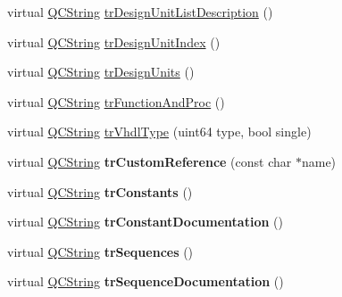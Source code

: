 \begin{DoxyCompactItemize}
\item 
virtual \mbox{\hyperlink{class_q_c_string}{Q\+C\+String}} \mbox{\hyperlink{class_translator_brazilian_aa790d2672648700af93604e5b8d4779d}{tr\+Design\+Unit\+List\+Description}} ()
\item 
virtual \mbox{\hyperlink{class_q_c_string}{Q\+C\+String}} \mbox{\hyperlink{class_translator_brazilian_ac42aa7b09227dfed71f923c7f3adffc8}{tr\+Design\+Unit\+Index}} ()
\item 
virtual \mbox{\hyperlink{class_q_c_string}{Q\+C\+String}} \mbox{\hyperlink{class_translator_brazilian_a39cab5e13d360ff7bf232c10189975c2}{tr\+Design\+Units}} ()
\item 
virtual \mbox{\hyperlink{class_q_c_string}{Q\+C\+String}} \mbox{\hyperlink{class_translator_brazilian_a035d996869c5c8e3f2fe15c9fd28238b}{tr\+Function\+And\+Proc}} ()
\item 
virtual \mbox{\hyperlink{class_q_c_string}{Q\+C\+String}} \mbox{\hyperlink{class_translator_brazilian_a8cfd7c0ac4952835ab2ca311aa32f74e}{tr\+Vhdl\+Type}} (uint64 type, bool single)
\item 
\mbox{\label{class_translator_brazilian_a1452cfd246d529e979d29ba217476521}} 
virtual \mbox{\hyperlink{class_q_c_string}{Q\+C\+String}} {\bfseries tr\+Custom\+Reference} (const char $\ast$name)
\item 
\mbox{\label{class_translator_brazilian_adabcc54dc066018a18de3dcae28d25f5}} 
virtual \mbox{\hyperlink{class_q_c_string}{Q\+C\+String}} {\bfseries tr\+Constants} ()
\item 
\mbox{\label{class_translator_brazilian_ac54b940d953e3db9c2403484af866baa}} 
virtual \mbox{\hyperlink{class_q_c_string}{Q\+C\+String}} {\bfseries tr\+Constant\+Documentation} ()
\item 
\mbox{\label{class_translator_brazilian_ad9dc57350c6eb1ca0ee3143e96ea24d6}} 
virtual \mbox{\hyperlink{class_q_c_string}{Q\+C\+String}} {\bfseries tr\+Sequences} ()
\item 
\mbox{\label{class_translator_brazilian_a90064cac28b1bb954914d1ee653bf7b1}} 
virtual \mbox{\hyperlink{class_q_c_string}{Q\+C\+String}} {\bfseries tr\+Sequence\+Documentation} ()
\item 

\end{DoxyCompactItemize}
